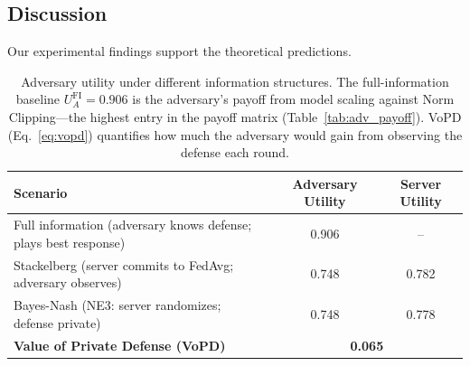 \documentclass{article}
\begin{document}
\subsection{Discussion}

Our experimental findings support the theoretical predictions.

\begin{table}[t]
\caption{Adversary utility under different information structures. The full-information baseline $U_A^{\text{FI}} = 0.906$ is the adversary's payoff from model scaling against Norm Clipping---the highest entry in the payoff matrix (Table~\ref{tab:adv_payoff}). VoPD (Eq.~\ref{eq:vopd}) quantifies how much the adversary would gain from observing the defense each round.}
\label{tab:vopd}
\centering
\begin{tabular}{lcc}
\toprule
\textbf{Scenario} & \textbf{Adversary Utility} & \textbf{Server Utility} \\
\midrule
Full information (adversary knows defense; plays best response) & 0.906 & -- \\
Stackelberg (server commits to FedAvg; adversary observes) & 0.748 & 0.782 \\
Bayes-Nash (NE3: server randomizes; defense private) & 0.748 & 0.778 \\
\midrule
\textbf{Value of Private Defense (VoPD)} & \multicolumn{2}{c}{\textbf{0.065}} \\
\bottomrule
\end{tabular}
\end{table}
\end{document}
